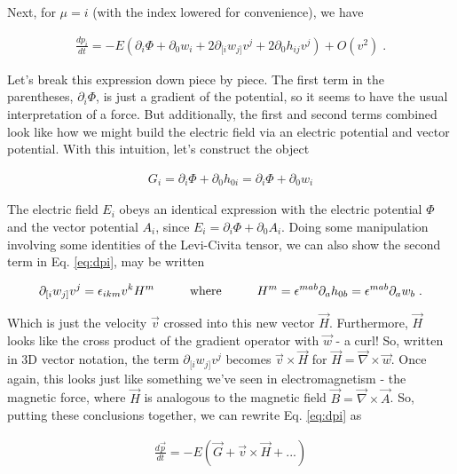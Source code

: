 \documentclass[10pt]{article}
\begin{document}
Next, for $\mu = i$ (with the index lowered for convenience), we have

\begin{align}\label{eq:dpi}
\frac{dp_i}{dt} = -E(\partial_i \Phi + \partial_0 w_i + 2 \partial_{[i} w_{j]} v^j + 2 \partial_0 h_{ij} v^j) + O(v^2) \; .
\end{align}

Let's break this expression down piece by piece. The first term in the parentheses, $\partial_i \Phi$, is just a gradient of the potential, so it seems to have the usual interpretation of a force. But additionally, the first and second terms combined look like how we might build the electric field via an electric potential and vector potential. With this intuition, let's construct the object

\begin{align}\label{eq:Gi}
G_i = \partial_i \Phi + \partial_0 h_{0i} = \partial_i \Phi + \partial_0 w_i
\end{align}

The electric field $E_i$ obeys an identical expression with the electric potential $\Phi$ and the vector potential $A_i$, since $E_i = \partial_i \Phi + \partial_0 A_i$. Doing some manipulation involving some identities of the Levi-Civita tensor, we can also show the second term in Eq. \ref{eq:dpi}, may be written

\begin{align}\label{eq:gravitomagnetic}
\partial_{[i} w_{j]} v^j = \epsilon_{ikm} v^k H^m \hspace{1 cm} \textrm{where} \hspace{1 cm} H^m = \epsilon^{mab} \partial_a h_{0b} = \epsilon^{mab} \partial_a w_b \; .
\end{align}

Which is just the velocity $\vec{v}$ crossed into this new vector $\vec{H}$. Furthermore, $\vec{H}$ looks like the cross product of the gradient operator with $\vec{w}$ - a curl! So, written in 3D vector notation, the term $\partial_{[i} w_{j]} v^j$ becomes $\vec{v} \times \vec{H}$ for $\vec{H} = \vec{\nabla} \times \vec{w}$. Once again, this looks just like something we've seen in electromagnetism - the magnetic force, where $\vec{H}$ is analogous to the magnetic field $\vec{B} = \vec{\nabla} \times \vec{A}$. So, putting these conclusions together, we can rewrite Eq. \ref{eq:dpi} as

\begin{align}\label{eq:gravitoElectric}
\frac{d\vec{p}}{dt} = -E(\vec{G} + \vec{v} \times \vec{H} + ...)
\end{align}
\end{document}
